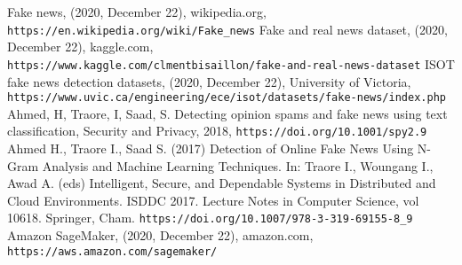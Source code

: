 \documentclass[a4paper,12pt,nottoc]{article}
\begin{document}
\begin{thebibliography}{9}
 Fake news, (2020, December 22), wikipedia.org, \\\texttt{https://en.wikipedia.org/wiki/Fake\_news}
 Fake and real news dataset, (2020, December 22), kaggle.com, \\\texttt{https://www.kaggle.com/clmentbisaillon/fake-and-real-news-dataset}
 ISOT fake news detection datasets, (2020, December 22), University of Victoria, \texttt{https://www.uvic.ca/engineering/ece/isot/datasets/fake-news/index.php}
 Ahmed, H, Traore, I, Saad, S. Detecting opinion spams and fake news using text classification, Security and Privacy, 2018, \texttt{https://doi.org/10.1001/spy2.9}
 Ahmed H., Traore I., Saad S. (2017) Detection of Online Fake News Using N-Gram Analysis and Machine Learning Techniques. In: Traore I., Woungang I., Awad A. (eds) Intelligent, Secure, and Dependable Systems in Distributed and Cloud Environments. ISDDC 2017. Lecture Notes in Computer Science, vol 10618. Springer, Cham. \texttt{https://doi.org/10.1007/978-3-319-69155-8\_9}
 Amazon SageMaker, (2020, December 22), amazon.com, \\\texttt{https://aws.amazon.com/sagemaker/}
\end{thebibliography}
\end{document}
